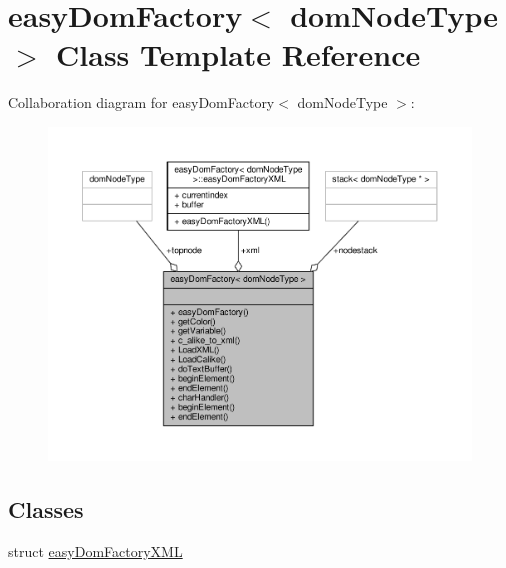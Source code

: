 \hypertarget{classeasyDomFactory}{}\section{easy\+Dom\+Factory$<$ dom\+Node\+Type $>$ Class Template Reference}
\label{classeasyDomFactory}


Collaboration diagram for easy\+Dom\+Factory$<$ dom\+Node\+Type $>$\+:
\nopagebreak
\begin{figure}[H]
\begin{center}
\leavevmode
\includegraphics[width=350pt]{da/d65/classeasyDomFactory__coll__graph}
\end{center}
\end{figure}
\subsection*{Classes}
\begin{DoxyCompactItemize}
\item 
struct \hyperlink{structeasyDomFactory_1_1easyDomFactoryXML}{easy\+Dom\+Factory\+X\+ML}
\end{DoxyCompactItemize}
